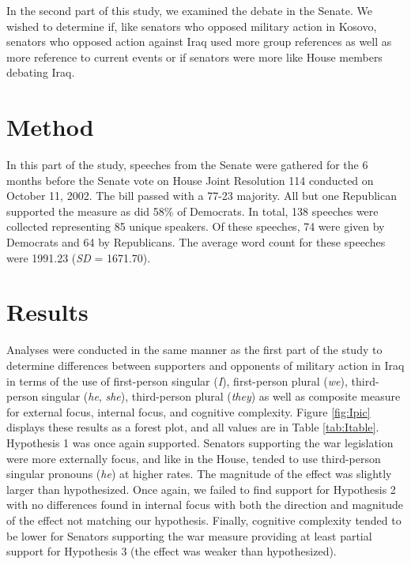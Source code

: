 \documentclass[
  english,
  ,man,floatsintext]{apa6}
\begin{document}
In the second part of this study, we examined the debate in the Senate. We wished to determine if, like senators who opposed military action in Kosovo, senators who opposed action against Iraq used more group references as well as more reference to current events or if senators were more like House members debating Iraq.

\hypertarget{method-3}{%
\section{Method}\label{method-3}}

In this part of the study, speeches from the Senate were gathered for the 6 months before the Senate vote on House Joint Resolution 114 conducted on October 11, 2002. The bill passed with a 77-23 majority. All but one Republican supported the measure as did 58\% of Democrats. In total, 138 speeches were collected representing 85 unique speakers. Of these speeches, 74 were given by Democrats and 64 by Republicans. The average word count for these speeches were 1991.23 (\emph{SD} = 1671.70).

\hypertarget{results-3}{%
\section{Results}\label{results-3}}

Analyses were conducted in the same manner as the first part of the study to determine differences between supporters and opponents of military action in Iraq in terms of the use of first-person singular (\emph{I}), first-person plural (\emph{we}), third-person singular (\emph{he}, \emph{she}), third-person plural (\emph{they}) as well as composite measure for external focus, internal focus, and cognitive complexity. Figure \ref{fig:Ipic} displays these results as a forest plot, and all values are in Table \ref{tab:Itable}. Hypothesis 1 was once again supported. Senators supporting the war legislation were more externally focus, and like in the House, tended to use third-person singular pronouns (\emph{he}) at higher rates. The magnitude of the effect was slightly larger than hypothesized. Once again, we failed to find support for Hypothesis 2 with no differences found in internal focus with both the direction and magnitude of the effect not matching our hypothesis. Finally, cognitive complexity tended to be lower for Senators supporting the war measure providing at least partial support for Hypothesis 3 (the effect was weaker than hypothesized).
\end{document}
